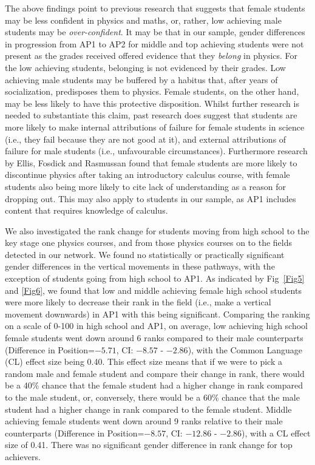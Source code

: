 The above findings point to previous research that suggests that female students may be less confident in physics\cite{B_E_2013,Sharma_2011,Hofer_2016} and maths\cite{Else_Quest_2013, Sheldrake_2015}, or, rather, low achieving male students may be \textit{over-confident}. It may be that in our sample, gender differences in progression from AP1 to AP2 for middle and top achieving students were not present as the grades received offered evidence that they \textit{belong} in physics. For the low achieving students, belonging is not evidenced by their grades. Low achieving male students may be buffered by a habitus that, after years of socialization, predisposes them to physics. Female students, on the other hand, may be less likely to have this protective disposition. Whilst further research is needed to substantiate this claim, past research does suggest that students are more likely to make internal attributions of failure for female students in science (i.e., they fail because they are not good at it), and external attributions of failure for male students (i.e., unfavourable circumstances)\cite{LaCosse_2016}. Furthermore research by Ellis, Fosdick and Rasmussan\cite{Ellis_2016} found that female students are more likely to discontinue physics after taking an introductory calculus course, with female students also being more likely to cite lack of understanding as a reason for dropping out. This may also apply to students in our sample, as AP1 includes content that requires knowledge of calculus.

We also investigated the rank change for students moving from high school to the key stage one physics courses, and from those physics courses on to the fields detected in our network. We found no statistically or practically significant gender differences in the vertical movements in these pathways, with the exception of students going from high school to AP1. As indicated by Fig~\ref{Fig5} and \ref{Fig6}, we found that low and middle achieving female high school students were more likely to decrease their rank in the field (i.e., make a vertical movement downwards) in AP1 with this being significant. Comparing the ranking on a scale of 0-100 in high school and AP1, on average, low achieving high school female students went down around 6 ranks compared to their male counterparts (Difference in Position=$-5.71$, CI: $-8.57$ - $-2.86$), with the Common Language (CL) effect size being 0.40. This effect size means that if we were to pick a random male and female student and compare their change in rank, there would be a 40\% chance that the female student had a higher change in rank compared to the male student, or, conversely, there would be a 60\% chance that the male student had a higher change in rank compared to the female student. Middle achieving female students went down around 9 ranks relative to their male counterparts (Difference in Position=$-8.57$, CI: $-12.86$ - $-2.86$), with a CL effect size of 0.41. There was no significant gender difference in rank change for top achievers. 



